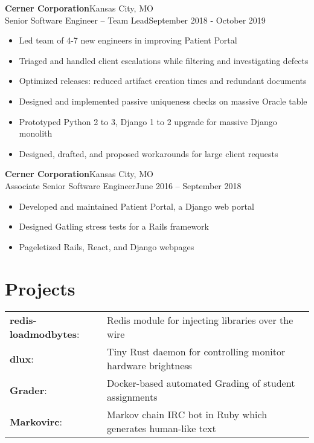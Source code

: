 \documentclass[margin]{res}
\newcommand{\github}[0]%
{%
  \hspace{-4mm}\faIcon{github}\hspace{1mm}%
}
\begin{document}
\begin{resume}
       \textbf{Cerner Corporation}\hfill Kansas City, MO\\
         Senior Software Engineer -- Team Lead\hfill September 2018 - October 2019
         \begin{itemize} \itemsep -1pt  %
            \item Led team of 4-7 new engineers in improving Patient Portal
            \item Triaged and handled client escalations while filtering and investigating defects
            \item Optimized releases: reduced artifact creation times and redundant documents
            \item Designed and implemented passive uniqueness checks on massive Oracle table
            \item Prototyped Python 2 to 3, Django 1 to 2 upgrade for massive Django monolith
            \item Designed, drafted, and proposed workarounds for large client requests
         \end{itemize}

       \textbf{Cerner Corporation}\hfill Kansas City, MO\\
         Associate Senior Software Engineer\hfill June 2016 -- September 2018
         \begin{itemize} \itemsep -1pt  %
            \item Developed and maintained Patient Portal, a Django web portal
            \item Designed Gatling stress tests for a Rails framework
            \item Pageletized Rails, React, and Django webpages
         \end{itemize}

    \section{Projects}
      \begin{tabular}{l p{4in}}
        \href{https://github.com/brhoades/redis-loadmodbytes}{\github}\textbf{redis-loadmodbytes}:  & Redis module for injecting libraries over the wire \\ [1pt]
        \href{https://github.com/brhoades/dlux}{\github}\textbf{dlux}:                              & Tiny Rust daemon for controlling monitor hardware brightness \\ [1pt]
        \href{https://github.com/redkyn/grader}{\github}\textbf{Grader}:                            & Docker-based automated Grading of student assignments \\ [1pt]
        \href{https://github.com/linuxmercedes/markovirc}{\github}\textbf{Markovirc}:               & Markov chain IRC bot in Ruby which generates human-like text \\ [1pt]
      \end{tabular}


\end{resume}
\end{document}
